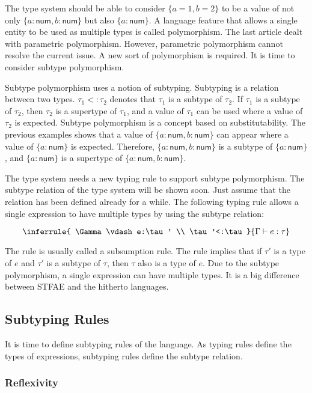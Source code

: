 The type system should be able to consider $\{a=1,b=2\}$ to be a value of not
only $\{a:\textsf{num},b:\textsf{num}\}$ but also $\{a:\textsf{num}\}$. A language
feature that allows a single entity to be used as multiple types is called
polymorphism. The last article dealt with parametric polymorphism. However,
parametric polymorphism cannot resolve the current issue. A new sort of
polymorphism is required. It is time to consider subtype polymorphism.

Subtype polymorphism uses a notion of subtyping. Subtyping is a relation between
two types. $\tau_1<:\tau_2$ denotes that $\tau_1$ is a subtype of
$\tau_2$. If $\tau_1$ is a subtype of $\tau_2$, then $\tau_2$ is a
supertype of $\tau_1$, and a value of $\tau_1$ can be used where a value of
$\tau_2$ is expected. Subtype polymorphism is a concept based on
substitutability. The previous examples shows that a value of \(\{a:\textsf{
num},b:\textsf{num}\}\) can appear where a value of $\{a:\textsf{num}\}$ is
expected. Therefore, $\{a:\textsf{num},b:\textsf{num}\}$ is a subtype of \(\{a:\textsf{
num}\}\), and $\{a:\textsf{num}\}$ is a supertype of \(\{a:\textsf{num},b:\textsf{
num}\}\).

The type system needs a new typing rule to support subtype polymorphism. The
subtype relation of the type system will be shown soon. Just assume that the
relation has been defined already for a while. The following typing rule allows
a single expression to have multiple types by using the subtype relation:

\[
\inferrule
{ \Gamma\vdash e:\tau' \\ \tau'<:\tau }
{ \Gamma\vdash e:\tau }
\]

The rule is usually called a subsumption rule. The rule implies that if
$\tau'$ is a type of $e$ and $\tau'$ is a subtype of $\tau$, then
$\tau$ also is a type of $e$. Due to the subtype polymorphism, a single
expression can have multiple types. It is a big difference between STFAE and the
hitherto languages.

\subsection{Subtyping Rules}

It is time to define subtyping rules of the language. As typing rules define the
types of expressions, subtyping rules define the subtype relation.

\subsubsection{Reflexivity}

